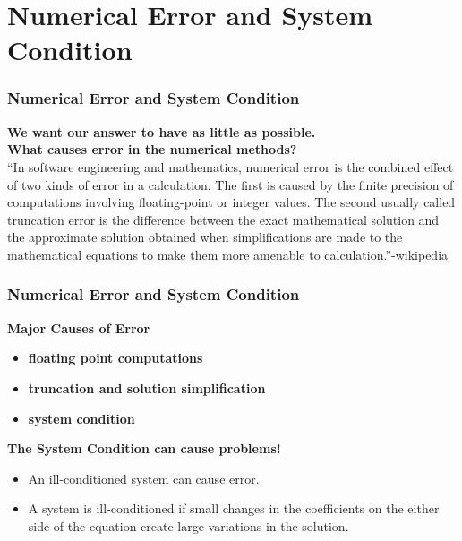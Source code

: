 \documentclass[fleqn]{beamer} %
\newcommand{\sectiontitleIV}{Numerical Error and System Condition}
\begin{document}
\section{\sectiontitleIV}

\begin{frame}[label=sectionIV] \small
  \frametitle{\sectiontitleIV}
\textbf{We want our answer to have as little  as possible.} \vspace{3mm}\\

		\textbf{What causes error in the numerical methods?} \\
			``In software engineering and mathematics, numerical error is the combined effect of two kinds of error in a calculation. The first is caused by the finite precision of computations involving floating-point or integer values. The second usually called truncation error is the difference between the exact mathematical solution and the approximate solution obtained when simplifications are made to the mathematical equations to make them more amenable to calculation.''-wikipedia\\
		

\end{frame}

\begin{frame}\small 
  \frametitle{\sectiontitleIV}
	\textbf{Major Causes of Error} \\
		\begin{itemize}
			\item \textbf{floating point computations} \vspace{3mm}\\
			\item \textbf{truncation and solution simplification} \vspace{3mm}\\
			\item \textbf{system condition} \vspace{3mm}\\
		\end{itemize}
		
		 \textbf{ The {\B System Condition} can cause problems!} \\
\begin{itemize}
	 \item An {\PR ill-conditioned} system can cause error. \\
	
	\item A system is {\PR ill-conditioned} if small changes in the coefficients on the either side of the equation create large variations in the solution.\\
	\end{itemize}
\end{frame}
\end{document}

